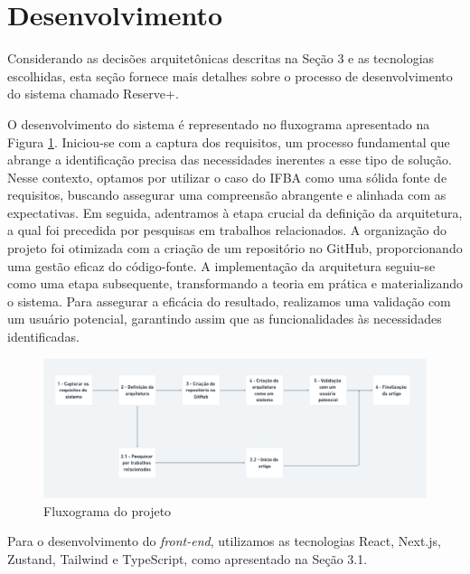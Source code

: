 \documentclass[12pt]{article}
\begin{document}
\section{Desenvolvimento} \label{sec:desenvolvimento}

Considerando as decisões arquitetônicas descritas na Seção 3 e as tecnologias escolhidas, esta seção fornece mais detalhes sobre o processo de desenvolvimento do sistema chamado Reserve+.

O desenvolvimento do sistema é representado no fluxograma apresentado na Figura \ref{fig:processos_desenvolvimento_do_artigo}. Iniciou-se com a captura dos requisitos, um processo fundamental que abrange a identificação precisa das necessidades inerentes a esse tipo de solução. Nesse contexto, optamos por utilizar o caso do IFBA como uma sólida fonte de requisitos, buscando assegurar uma compreensão abrangente e alinhada com as expectativas. Em seguida, adentramos à etapa crucial da definição da arquitetura, a qual foi precedida por pesquisas em trabalhos relacionados. A organização do projeto foi otimizada com a criação de um repositório no GitHub, proporcionando uma gestão eficaz do código-fonte. A implementação da arquitetura seguiu-se como uma etapa subsequente, transformando a teoria em prática e materializando o sistema. Para assegurar a eficácia do resultado, realizamos uma validação com um usuário potencial, garantindo assim que as funcionalidades às necessidades identificadas.

\begin{figure}[ht]
\centering
\includegraphics[width=1.0\textwidth]{processos_desenvolvimento_do_artigo.png}
\caption{Fluxograma do projeto}
\label{fig:processos_desenvolvimento_do_artigo}
\end{figure}

Para o desenvolvimento do \textit{front-end}, utilizamos as tecnologias React, Next.js, Zustand, Tailwind e TypeScript, como apresentado na Seção 3.1. 
\end{document}
